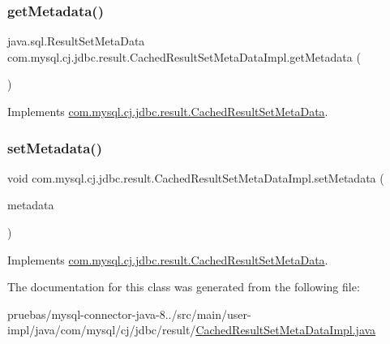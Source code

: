 \subsubsection{\texorpdfstring{get\+Metadata()}{getMetadata()}}
{\footnotesize\ttfamily java.\+sql.\+Result\+Set\+Meta\+Data com.\+mysql.\+cj.\+jdbc.\+result.\+Cached\+Result\+Set\+Meta\+Data\+Impl.\+get\+Metadata (\begin{DoxyParamCaption}{ }\end{DoxyParamCaption})}



Implements \mbox{\hyperlink{interfacecom_1_1mysql_1_1cj_1_1jdbc_1_1result_1_1_cached_result_set_meta_data_a80240641b218f0bfb75d3a06669ab0c1}{com.\+mysql.\+cj.\+jdbc.\+result.\+Cached\+Result\+Set\+Meta\+Data}}.

\mbox{\label{classcom_1_1mysql_1_1cj_1_1jdbc_1_1result_1_1_cached_result_set_meta_data_impl_ae5fdc22b3e94b8fd950721c1c8fea867}} 
\subsubsection{\texorpdfstring{set\+Metadata()}{setMetadata()}}
{\footnotesize\ttfamily void com.\+mysql.\+cj.\+jdbc.\+result.\+Cached\+Result\+Set\+Meta\+Data\+Impl.\+set\+Metadata (\begin{DoxyParamCaption}\item[{java.\+sql.\+Result\+Set\+Meta\+Data}]{metadata }\end{DoxyParamCaption})}



Implements \mbox{\hyperlink{interfacecom_1_1mysql_1_1cj_1_1jdbc_1_1result_1_1_cached_result_set_meta_data_a29872cda6030096e51fc2397fa3b7135}{com.\+mysql.\+cj.\+jdbc.\+result.\+Cached\+Result\+Set\+Meta\+Data}}.



The documentation for this class was generated from the following file\+:\begin{DoxyCompactItemize}
\item 
pruebas/mysql-\/connector-\/java-\/8../src/main/user-\/impl/java/com/mysql/cj/jdbc/result/\mbox{\hyperlink{_cached_result_set_meta_data_impl_8java}{Cached\+Result\+Set\+Meta\+Data\+Impl.\+java}}\end{DoxyCompactItemize}
